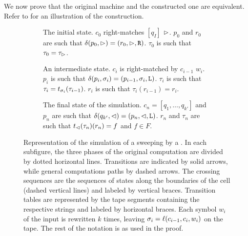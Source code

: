 We now prove that the original machine and the constructed one are equivalent.
Refer to  for an illustration of the construction.
\begin{figure}
	\centering
	\begin{subfigure}[b]{0.32\textwidth}
		\centering
		
		\caption{The initial state.
			$c_0$ right-matches $[q_I]$ \wrt $\rhd$.
			$p_0$ and $r_0$ are such that $\delta(p_0,\rhd)=(r_0,\rhd,\mathtt R)$.
			$\tau_0$ is such that $\tau_0=\tau_\rhd$.\newline}
		\label{sfig:swepkDLAtoNFA-start}
	\end{subfigure}
	\hfill
	\begin{subfigure}[b]{0.32\textwidth}
		\centering
		
		\caption{An intermediate state.
			$c_i$ is right-matched by $c_{i-1}$ \wrt $w_i$.
			$p_i$ is such that $\delta(p_i,\sigma_i)=(p_{i-1},\sigma_i,\mathtt L)$.
			$\tau_i$ is such that $\tau_i=t_{\sigma_i}(\tau_{i-1})$.
			$r_i$ is such that $\tau_i(r_{i-1})=r_i$.}
		\label{sfig:swepkDLAtoNFA-mid}
	\end{subfigure}
	\hfill
	\begin{subfigure}[b]{0.33\textwidth}
		\centering
		
		\caption{The final state of the simulation.
		$c_n=[q_1,\dots,q_{k'}]$ and $p_n$ are such that $\delta(q_{k'},\lhd)=(p_n,\lhd,\mathtt L)$.
		$r_n$ and $\tau_n$ are such that $t_\lhd(\tau_n)(r_n)=f$ and $f\in F$.\newline}
		\label{sfig:swepkDLAtoNFA-end}
	\end{subfigure}

	\caption{Representation of the simulation of a sweeping \kDLA by a \ONFA.
		In each subfigure, the three phases of the original computation are divided by dotted horizontal lines.
		Transitions are indicated by solid arrows, while general computations paths by dashed arrows.
		The crossing sequences are the sequences of states along the boundaries of the cell (dashed vertical lines) and labeled by vertical braces.
		Transition tables are represented by the tape segments containing the respective strings and labeled by horizontal braces.
		Each symbol $w_i$ of the input is rewritten $k$ times, leaving $\sigma_i=\ell(c_{i-1},c_i,w_i)$ on the tape.
		The rest of the notation is as used in the proof.}
	\label{fig:swepkDLAtoNFA}
\end{figure}

